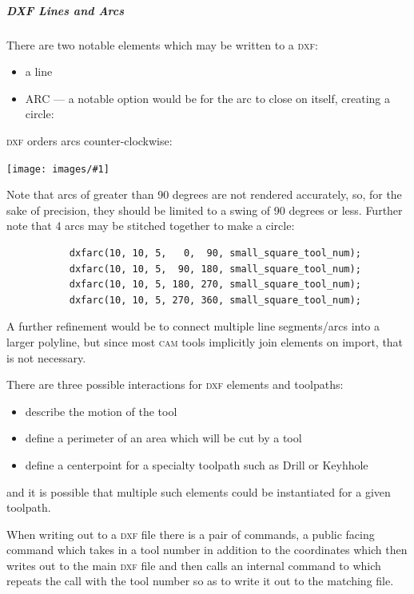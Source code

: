 \documentclass{ltxdoc}
\newcommand{\includeimage}[1]{\bigskip\noindent\texttt{[image: images/\#1]}\bigskip}
\begin{document}
\subparagraph*{DXF Lines and Arcs}%
 
There are two notable elements which may be written to a \textsc{dxf}:

\begin{itemize}
 \item a line %
 \item ARC --- a notable option would be for the arc to close on itself, creating a circle:
\end{itemize}
 
\textsc{dxf} orders arcs counter-clockwise:

\includeimage{arcs_circle_degrees.pdf}%

Note that arcs of greater than 90 degrees are not rendered accurately, so, for the sake of precision, they should be limited to a swing of 90 degrees or less. Further note that 4 arcs may be stitched together to make a circle:
 
\begin{verbatim}
           dxfarc(10, 10, 5,   0,  90, small_square_tool_num);
           dxfarc(10, 10, 5,  90, 180, small_square_tool_num);
           dxfarc(10, 10, 5, 180, 270, small_square_tool_num);
           dxfarc(10, 10, 5, 270, 360, small_square_tool_num);
\end{verbatim}
 
A further refinement would be to connect multiple line segments/arcs into a larger polyline, but since most \textsc{cam} tools implicitly join elements on import, that is not necessary.
 
There are three possible interactions for \textsc{dxf} elements and toolpaths:

\begin{itemize}
 \item describe the motion of the tool
 \item define a perimeter of an area which will be cut by a tool
 \item define a centerpoint for a specialty toolpath such as Drill or Keyhhole
\end{itemize}
 
\noindent and it is possible that multiple such elements could be instantiated for a given toolpath.
 
When writing out to a \textsc{dxf} file there is a pair of commands, a public facing command which takes in a tool number in addition to the coordinates which then writes out to the main \textsc{dxf} file and then calls an internal command to which repeats the call with the tool number so as to write it out to the matching file.
\end{document}
